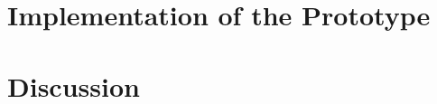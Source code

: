 \documentclass[12pt, a4paper, titlepage]{book}
\begin{document}
	\chapter{Implementation of the Prototype}
	
	
	\chapter{Discussion}
	
	
	\nocite{Scharm2014a} %
	
	
	
	
	\begin{appendices}
		\appendixpage
		\noappendicestocpagenum
		\addappheadtotoc
		
		
	\end{appendices}
\end{document}
